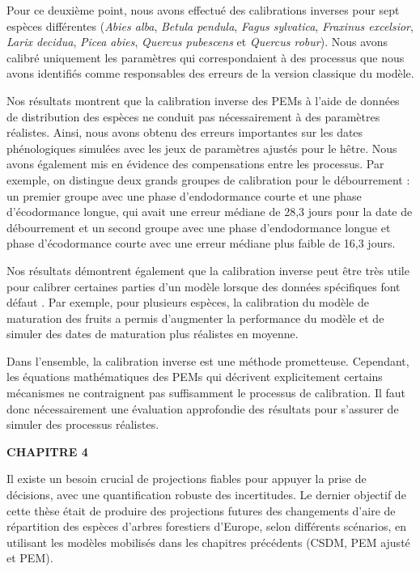 Pour ce deuxième point, nous avons effectué des calibrations inverses pour sept espèces différentes (\emph{Abies alba},  \emph{Betula pendula}, \emph{Fagus sylvatica}, \emph{Fraxinus excelsior}, \emph{Larix decidua}, \emph{Picea abies},  \emph{Quercus pubescens} et \emph{Quercus robur}). Nous avons calibré uniquement les paramètres qui correspondaient à des processus que nous avons identifiés comme responsables des erreurs de la version classique du modèle.

Nos résultats montrent que la calibration inverse des PEMs à l’aide de données de distribution des espèces ne conduit pas nécessairement à des paramètres réalistes. Ainsi, nous avons obtenu des erreurs importantes sur les dates phénologiques simulées avec les jeux de paramètres ajustés pour le hêtre. Nous avons également mis en évidence des compensations entre les processus. Par exemple, on distingue deux grands groupes de calibration pour le débourrement : un premier groupe avec une phase d'endodormance courte et une phase d'écodormance longue, qui avait une erreur médiane de 28,3 jours pour la date de débourrement et un second groupe avec une phase d'endodormance longue et phase d'écodormance courte avec une erreur médiane plus faible de 16,3 jours.

Nos résultats démontrent également que la calibration inverse peut être très utile pour calibrer certaines parties d’un modèle lorsque des données spécifiques font défaut \citep{Evans2016}. Par exemple, pour plusieurs espèces, la calibration du modèle de maturation des fruits a permis d'augmenter la performance du modèle et de simuler des dates de maturation plus réalistes en moyenne. 

Dans l’ensemble, la calibration inverse est une méthode prometteuse. Cependant, les équations mathématiques des PEMs qui décrivent explicitement certains mécanismes ne contraignent pas suffisamment le processus de calibration. Il faut donc nécessairement une évaluation approfondie des résultats pour s'assurer de simuler des processus réalistes.

\vspace*{1cm}
{\noindent\large\bfseries\sffamily CHAPITRE 4}

Il existe un besoin crucial de projections fiables pour appuyer la prise de décisions, avec une quantification robuste des incertitudes. Le dernier objectif de cette thèse était de produire des projections futures des changements d'aire de répartition des espèces d'arbres forestiers d'Europe, selon différents scénarios, en utilisant les modèles mobilisés dans les chapitres précédents (CSDM, PEM ajusté et PEM).

